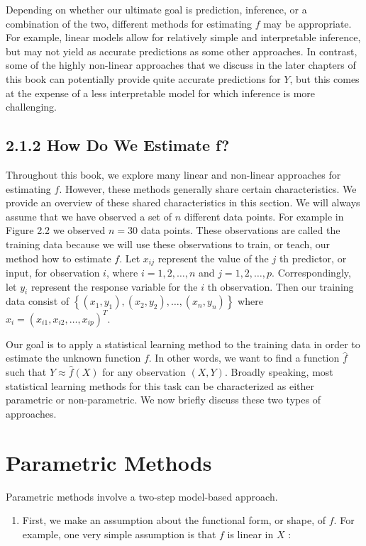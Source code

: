 \documentclass[10pt]{article}
\begin{document}
Depending on whether our ultimate goal is prediction, inference, or a combination of the two, different methods for estimating $f$ may be appropriate. For example, linear models allow for relatively simple and interpretable inference, but may not yield as accurate predictions as some other approaches. In contrast, some of the highly non-linear approaches that we discuss in the later chapters of this book can potentially provide quite accurate predictions for $Y$, but this comes at the expense of a less interpretable model for which inference is more challenging.

\subsection*{2.1.2 How Do We Estimate f?}
Throughout this book, we explore many linear and non-linear approaches for estimating $f$. However, these methods generally share certain characteristics. We provide an overview of these shared characteristics in this section. We will always assume that we have observed a set of $n$ different data points. For example in Figure 2.2 we observed $n=30$ data points. These observations are called the training data because we will use these observations to train, or teach, our method how to estimate $f$. Let $x_{i j}$ represent the value of the $j$ th predictor, or input, for observation $i$, where $i=1,2, \ldots, n$ and $j=1,2, \ldots, p$. Correspondingly, let $y_{i}$ represent the response variable for the $i$ th observation. Then our training data consist of $\left\{\left(x_{1}, y_{1}\right),\left(x_{2}, y_{2}\right), \ldots,\left(x_{n}, y_{n}\right)\right\}$ where $x_{i}=\left(x_{i 1}, x_{i 2}, \ldots, x_{i p}\right)^{T}$.

Our goal is to apply a statistical learning method to the training data in order to estimate the unknown function $f$. In other words, we want to find a function $\hat{f}$ such that $Y \approx \hat{f}(X)$ for any observation $(X, Y)$. Broadly speaking, most statistical learning methods for this task can be characterized as either parametric or non-parametric. We now briefly discuss these two types of approaches.

\section*{Parametric Methods}
Parametric methods involve a two-step model-based approach.

\begin{enumerate}
  \item First, we make an assumption about the functional form, or shape, of $f$. For example, one very simple assumption is that $f$ is linear in $X$ :
\end{enumerate}
\end{document}
